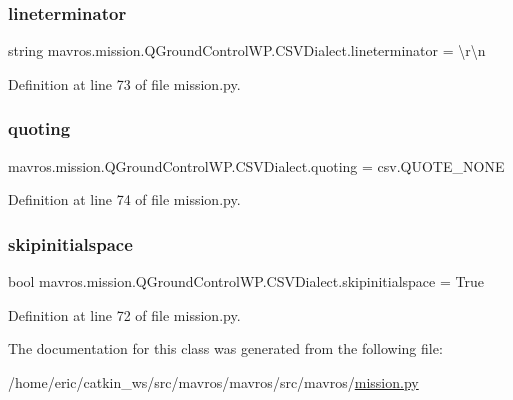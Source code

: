 \subsubsection{\texorpdfstring{lineterminator}{lineterminator}}
{\footnotesize\ttfamily string mavros.\+mission.\+Q\+Ground\+Control\+W\+P.\+C\+S\+V\+Dialect.\+lineterminator = \textquotesingle{}\textbackslash{}r\textbackslash{}n\textquotesingle{}\hspace{0.3cm}{\ttfamily [static]}}



Definition at line 73 of file mission.\+py.

\mbox{\label{classmavros_1_1mission_1_1QGroundControlWP_1_1CSVDialect_a5b83430985e67da10adba7ebf5347c42}} 
\subsubsection{\texorpdfstring{quoting}{quoting}}
{\footnotesize\ttfamily mavros.\+mission.\+Q\+Ground\+Control\+W\+P.\+C\+S\+V\+Dialect.\+quoting = csv.\+Q\+U\+O\+T\+E\+\_\+\+N\+O\+NE\hspace{0.3cm}{\ttfamily [static]}}



Definition at line 74 of file mission.\+py.

\mbox{\label{classmavros_1_1mission_1_1QGroundControlWP_1_1CSVDialect_a5165d88af04a87e06616aef36c57b23d}} 
\subsubsection{\texorpdfstring{skipinitialspace}{skipinitialspace}}
{\footnotesize\ttfamily bool mavros.\+mission.\+Q\+Ground\+Control\+W\+P.\+C\+S\+V\+Dialect.\+skipinitialspace = True\hspace{0.3cm}{\ttfamily [static]}}



Definition at line 72 of file mission.\+py.



The documentation for this class was generated from the following file\+:\begin{DoxyCompactItemize}
\item 
/home/eric/catkin\+\_\+ws/src/mavros/mavros/src/mavros/\mbox{\hyperlink{mission_8py}{mission.\+py}}\end{DoxyCompactItemize}
